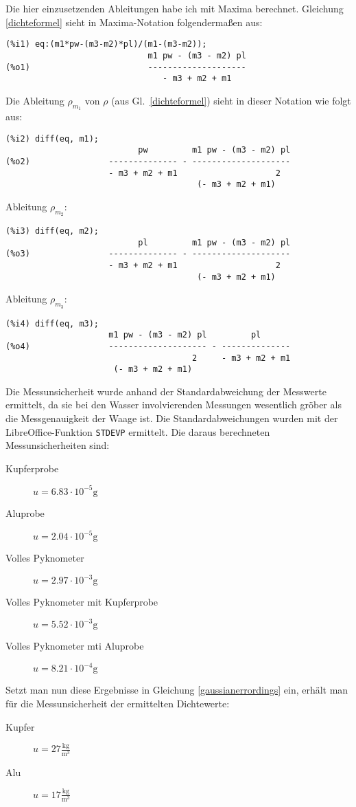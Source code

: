 \documentclass[12pt,a4paper,notitlepage]{article}
\begin{document}
Die hier einzusetzenden Ableitungen habe ich mit Maxima berechnet. Gleichung \ref{dichteformel} sieht in Maxima-Notation folgendermaßen aus:
\begin{verbatim}
(%i1) eq:(m1*pw-(m3-m2)*pl)/(m1-(m3-m2));
                             m1 pw - (m3 - m2) pl
(%o1)                        --------------------
                                - m3 + m2 + m1
\end{verbatim}
Die Ableitung $\rho_{m_1}$ von $\rho$ (aus Gl.\ \ref{dichteformel}) sieht in dieser Notation wie folgt aus:
\begin{verbatim}
(%i2) diff(eq, m1);
                           pw         m1 pw - (m3 - m2) pl
(%o2)                -------------- - --------------------
                     - m3 + m2 + m1                    2
                                       (- m3 + m2 + m1)
\end{verbatim}
Ableitung $\rho_{m_2}$: 
\begin{verbatim}
(%i3) diff(eq, m2);
                           pl         m1 pw - (m3 - m2) pl
(%o3)                -------------- - --------------------
                     - m3 + m2 + m1                    2
                                       (- m3 + m2 + m1)
\end{verbatim}
Ableitung $\rho_{m_3}$:
\begin{verbatim}
(%i4) diff(eq, m3);
                     m1 pw - (m3 - m2) pl         pl
(%o4)                -------------------- - --------------
                                      2     - m3 + m2 + m1
                      (- m3 + m2 + m1)
\end{verbatim}
Die Messunsicherheit wurde anhand der Standardabweichung der Messwerte ermittelt, da sie bei den Wasser involvierenden Messungen wesentlich gröber als die Messgenauigkeit der Waage ist. Die Standardabweichungen wurden mit der LibreOffice-Funktion \texttt{STDEVP} ermittelt. Die daraus berechneten Messunsicherheiten sind:
\begin{description}
\item[Kupferprobe]$u=6.83\cdot10^{-5}\mathrm{g}$
\item[Aluprobe]$u=2.04\cdot10^{-5}\mathrm{g}$
\item[Volles Pyknometer]$u=2.97\cdot10^{-3}\mathrm{g}$
\item[Volles Pyknometer mit Kupferprobe]$u=5.52\cdot10^{-3}\mathrm{g}$
\item[Volles Pyknometer mti Aluprobe]$u=8.21\cdot10^{-4}\mathrm{g}$
\end{description}
Setzt man nun diese Ergebnisse in Gleichung \ref{gaussianerrordings} ein, erhält man für die Messunsicherheit der ermittelten Dichtewerte:
\begin{description}
\item[Kupfer]$u=27\frac{\mathrm{kg}}{\mathrm{m}^3}$
\item[Alu]$u=17\frac{\mathrm{kg}}{\mathrm{m}^3}$
\end{description}
\end{document}
